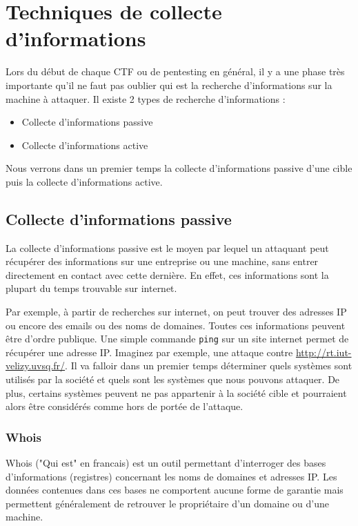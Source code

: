 \chapter{Techniques de collecte d'informations}
\label{chap:Mini Projet}
Lors du début de chaque CTF ou de pentesting en général, il y a une phase très importante qu'il ne faut pas oublier qui est la recherche d'informations sur la machine à attaquer. Il existe 2 types de recherche d'informations :

\begin{itemize}
  \item Collecte d'informations passive
  \item Collecte d'informations active 
\end{itemize}

 Nous verrons dans un premier temps la collecte d'informations passive d'une cible puis la collecte d'informations active.

\section{Collecte d'informations passive}

La collecte d'informations passive est le moyen par lequel un attaquant peut récupérer des informations sur une entreprise ou une machine, sans entrer directement en contact avec cette dernière. En effet, ces informations sont la plupart du temps trouvable sur internet.

Par exemple, à partir de recherches sur internet, on peut trouver des adresses IP ou encore des emails ou des noms de domaines. Toutes ces informations peuvent être d'ordre publique. Une simple commande \lstinline{ping} sur un site internet permet de récupérer une adresse IP. Imaginez par exemple, une attaque contre \url{http://rt.iut-velizy.uvsq.fr/}. Il va falloir dans un premier temps déterminer quels systèmes sont utilisés par la société et quels sont les systèmes que nous pouvons attaquer. De plus, certains systèmes peuvent ne pas appartenir à la société cible et pourraient alors être considérés comme hors de portée de l'attaque.

\subsection{Whois}

Whois ("Qui est" en francais)  est un outil permettant d'interroger des bases d'informations (registres) concernant les noms de domaines et adresses IP. Les données contenues dans ces bases ne comportent aucune forme de garantie mais permettent généralement de retrouver le propriétaire d'un domaine ou d'une machine.

